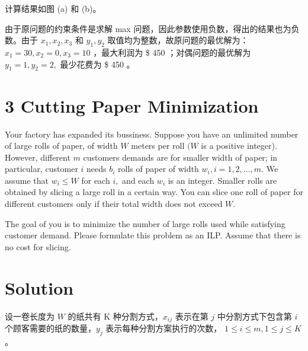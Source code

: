 \documentclass[UTF8]{ctexart}
\begin{document}
计算结果如图 (a) 和 (b)。

\begin{figure}
	\centering
	\hspace{0.5in}
\end{figure}

由于原问题的约束条件是求解 max 问题，因此参数使用负数，得出的结果也为负数。由于 $x_1, x_2, x_3$ 和 $y_1, y_2$ 取值均为整数，故原问题的最优解为：
$x_1 = 30, x_2 = 0, x_3 = 10$ ，最大利润为 \$ 450 ；对偶问题的最优解为 $y_1 = 1, y_2 = 2,$ 最少花费为 \$ 450 。
\section*{3  Cutting Paper Minimization}
Your factory has expanded its bussiness. Suppose you have an unlimited number of large rolls of paper, of width $W$ meters per roll $(W$ is a positive integer). However, different $m$ customers demands are for smaller width of paper; in particular, customer $i$ needs $b_{i}$ rolls of paper of width $w_{i}, i=1,2, \ldots, m .$ We assume that $w_{i} \leq W$ for each $i,$ and each $w_{i}$ is an integer. Smaller rolls are obtained by slicing a large roll in a certain way. You can slice one roll of paper for different customers only if their total width does not exceed $W$.

The goal of you is to minimize the number of large rolls used while satisfying customer demand. Please formulate this problem as an ILP. Assume that there is no cost for slicing.
\section*{Solution}
设一卷长度为 $W$ 的纸共有 K 种分割方式，$x_{ij}$ 表示在第 $j$ 中分割方式下包含第 $i$ 个顾客需要的纸的数量，$y_j$ 表示每种分割方案执行的次数， $1\leq i \leq m, 1\leq j \leq K$。
\end{document}
